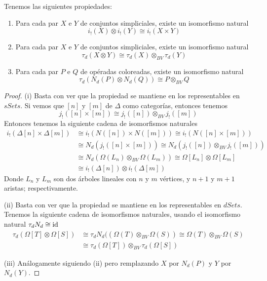 \documentclass[../main.tex]{subfiles}
\begin{document}
\begin{prop}
    Tenemos las siguientes propiedades:
    \begin{enumerate}
        \item[{\rm (i)}] Para cada par $X$ e $Y$ de conjuntos simpliciales, existe un isomorfismo natural
              $$
                  i_!(X)\otimes i_!(Y) \cong i_!(X\times Y)
              $$
        \item[{\rm (ii)}] Para cada par $X$ e $Y$ de conjuntos simpliciales, existe un isomorfismo natural
              $$
                  \tau_d(X\otimes Y) \cong \tau_d(X) \otimes_{BV} \tau_d(Y)
              $$
        \item[{\rm (iii)}] Para cada par $P$ e $Q$ de op\'eradas coloreadas, existe un isomorfismo natural
              $$
                  \tau_d(N_d(P)\otimes N_d(Q)) \cong P \otimes_{BV} Q
              $$
    \end{enumerate}
    \begin{proof}
        (i) Basta con ver que la propiedad se mantiene en los representables en $sSets$. Si vemos que $[n]$ y $[m]$ de $\Delta$ como categor\'ias, entonces tenemos
        $$
            j_!([n]\times [m]) \cong j_!([n]) \otimes_{BV} j_!([m])
        $$
        Entonces tenemos la siguiente cadena de isomorfismos naturales
        \begin{align*}
            i_!(\Delta[n]\times\Delta[m]) & \cong i_!(N([n])\times N([m]))\cong i_!(N([n]\times[m]))                          \\
                                          & \cong N_d(j_!([n]\times [m])) \cong N_d(j_!([n])\otimes_{BV}j_!([m]))             \\
                                          & \cong N_d(\Omega(L_n)\otimes_{BV}\Omega(L_m)) \cong \Omega[L_n]\otimes\Omega[L_m] \\
                                          & \cong i_!(\Delta[n])\otimes i_!(\Delta[m])
        \end{align*}
        Donde $L_n$ y $L_m$ son dos \'arboles lineales con $n$ y $m$ v\'ertices, y $n+1$ y $m+1$ aristas; respectivamente.

        (ii) Basta con ver que la propiedad se mantiene en los representables en $dSets$. Tenemos la siguiente cadena de isomorfismos naturales, usando el isomorfismo natural $\tau_d N_d\cong \rm id$
        \begin{align*}
            \tau_d(\Omega[T]\otimes\Omega[S]) & \cong \tau_d N_d((\Omega(T)\otimes_{BV}\Omega(S)) \cong \Omega(T)\otimes_{BV}\Omega(S) \\
                                              & \cong \tau_d(\Omega[T])\otimes_{BV}\tau_d(\Omega[S])
        \end{align*}

        (iii) An\'alogamente siguiendo (ii) pero remplazando $X$ por $N_d(P)$ y $Y$ por $N_d(Y)$.
    \end{proof}
\end{prop}
\end{document}
